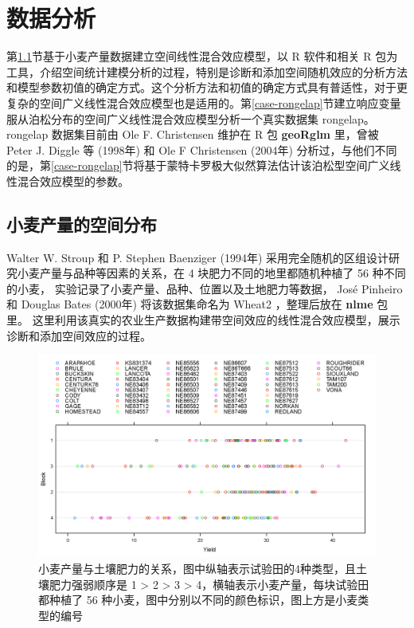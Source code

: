 \documentclass[12pt,a4paper,UTF8,twoside]{book}
\theoremstyle{definition}
\theoremstyle{definition}
\theoremstyle{definition}
\theoremstyle{remark}
\begin{document}
\hypertarget{applications}{%
\chapter{数据分析}\label{applications}}

第\ref{sec:spatial-random-effects}节基于小麦产量数据建立空间线性混合效应模型，以
R 软件和相关 R
包为工具，介绍空间统计建模分析的过程，特别是诊断和添加空间随机效应的分析方法和模型参数初值的确定方式。这个分析方法和初值的确定方式具有普适性，对于更复杂的空间广义线性混合效应模型也是适用的。第\ref{case-rongelap}节建立响应变量服从泊松分布的空间广义线性混合效应模型分析一个真实数据集
rongelap。rongelap 数据集目前由 Ole F. Christensen 维护在 R 包
\textbf{geoRglm} 里，曾被 Peter J. Diggle 等 (1998年) \citep{Diggle1998}
和 Ole F Christensen (2004年) \citep{Christensen2004}
分析过，与他们不同的是，第\ref{case-rongelap}节将基于蒙特卡罗极大似然算法估计该泊松型空间广义线性混合效应模型的参数。

\hypertarget{sec:spatial-random-effects}{%
\section{小麦产量的空间分布}\label{sec:spatial-random-effects}}

Walter W. Stroup 和 P. Stephen Baenziger (1994年) \citep{Stroup1994}
采用完全随机的区组设计研究小麦产量与品种等因素的关系，在 4
块肥力不同的地里都随机种植了 56 种不同的小麦，
实验记录了小麦产量、品种、位置以及土地肥力等数据， José Pinheiro 和
Douglas Bates (2000年) \citep{Pinheiro2000} 将该数据集命名为 Wheat2
，整理后放在 \textbf{nlme} 包里。
这里利用该真实的农业生产数据构建带空间效应的线性混合效应模型，展示诊断和添加空间效应的过程。

\begin{figure}

{\centering \includegraphics[width=0.85\linewidth]{figures/Yields-Block} 

}

\caption{小麦产量与土壤肥力的关系，图中纵轴表示试验田的4种类型，且土壤肥力强弱顺序是 1 > 2 > 3 > 4，横轴表示小麦产量，每块试验田都种植了 56 种小麦，图中分别以不同的颜色标识，图上方是小麦类型的编号}\label{fig:yields-block}
\end{figure}
\end{document}
